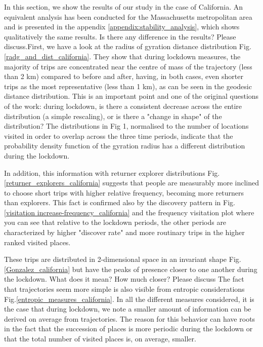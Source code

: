 \documentclass[main.tex]{subfiles}
\begin{document}
\label{results}

In this section, we show the results of our study in the case of California. An equivalent analysis has been conducted for the Massachusetts metropolitan area and is presented in the appendix \ref{appendix:stability_analysis}, which shows qualitatively the same results. {\color{red} Is there any difference in the results? Please discuss.}First, we have a look at the radius of gyration distance distribution Fig.\ref{radg_and_dist_california}. They show that during lockdown measures, the majority of trips are concentrated near the centre of mass of the trajectory (less than 2 km) compared to before and after, having, in both cases, even shorter trips as the most representative (less than 1 km), as can be seen in the geodesic distance distribution. {\color{red} This is an important point and one of the original questions of the work: during lockdown, is there a consistent decrease across the entire distribution (a simple rescaling), or is there a "change in shape" of the distribution? The distributions in Fig 1, normalised to the number of locations visited in order to overlap across the three time periods, indicate that the probability density function of the gyration radius has a different distribution during the lockdown.}

In addition, this information with returner explorer distributions Fig.\ref{returner_explorers_california} suggests that people are measurably more inclined to choose short trips with higher relative frequency, becoming more returners than explorers. This fact is confirmed also by the discovery pattern in Fig.\ref{visitation increase-frequency_california} and the frequency visitation plot where you can see that relative to the lockdown periods, the other periods are characterized by higher "discover rate" and more routinary trips in the higher ranked visited places.

These trips are distributed in 2-dimensional space in an invariant shape Fig.\ref{Gonzalez_california} but have the peaks of presence closer to one another during the lockdown. {\color{red}What does it mean? How much closer? Please discuss} The fact that trajectories seem more simple is also visible from entropic considerations Fig.\ref{entropic_measures_california}. In all the different measures considered, it is the case that during lockdown, we note a smaller amount of information can be derived on average from trajectories.  The reason for this behavior can have roots in the fact that the succession of places is more periodic during the lockdown or that the total number of visited places is, on average, smaller.
\end{document}
